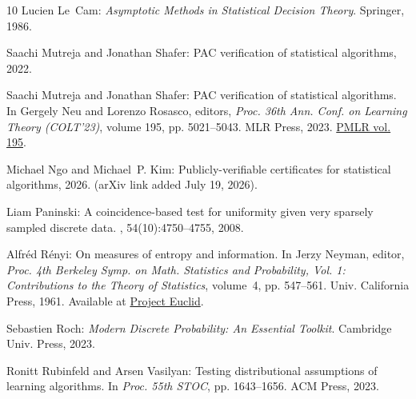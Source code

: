 \begin{thebibliography}{10}
{\sc Lucien Le~Cam}: {\em Asymptotic Methods in Statistical Decision Theory}.
\newblock Springer, 1986.
\newblock [\epfmtdoi{10.1007/978-1-4612-4946-7}]

{\sc Saachi Mutreja and Jonathan Shafer}: {PAC} verification of statistical
  algorithms, 2022.

{\sc Saachi Mutreja and Jonathan Shafer}: {PAC} verification of statistical
  algorithms.
\newblock In {\sc Gergely Neu and Lorenzo Rosasco}, editors, {\em Proc. 36th
  Ann. Conf. on Learning Theory (COLT'23)}, volume 195, pp. 5021--5043. MLR
  Press, 2023.
\newblock \href{https://proceedings.mlr.press/v195/mutreja23a.html}{PMLR vol.
  195}.

{\sc Michael Ngo and Michael~P. Kim}: Publicly-verifiable certificates for
  statistical algorithms, 2026.
\newblock (arXiv link added July 19, 2026).

{\sc Liam Paninski}: A coincidence-based test for uniformity given very
  sparsely sampled discrete data.
, 54(10):4750--4755, 2008.

{\sc Alfr{\'e}d R{\'e}nyi}: On measures of entropy and information.
\newblock In {\sc Jerzy Neyman}, editor, {\em Proc. 4th Berkeley Symp. on Math.
  Statistics and Probability, Vol. 1: Contributions to the Theory of
  Statistics}, volume~4, pp. 547--561. Univ. California Press, 1961.
\newblock Available at
  \href{https://projecteuclid.org/ebook/download?urlId=bsmsp/1200512181&isFullBook=false}{Project
  Euclid}.

{\sc Sebastien Roch}: {\em Modern Discrete Probability: {A}n Essential
  Toolkit}.
\newblock Cambridge Univ. Press, 2023.
\newblock [\epfmtdoi{10.1017/9781009305129}]

{\sc Ronitt Rubinfeld and Arsen Vasilyan}: Testing distributional assumptions
  of learning algorithms.
\newblock In {\em Proc. 55th STOC}, pp. 1643--1656. ACM Press, 2023.


\end{thebibliography}
